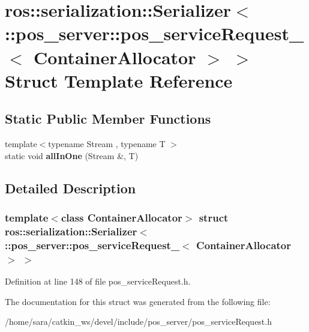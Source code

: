 \hypertarget{structros_1_1serialization_1_1Serializer_3_01_1_1pos__server_1_1pos__serviceRequest___3_01ContainerAllocator_01_4_01_4}{}\section{ros\+:\+:serialization\+:\+:Serializer$<$ \+:\+:pos\+\_\+server\+:\+:pos\+\_\+service\+Request\+\_\+$<$ Container\+Allocator $>$ $>$ Struct Template Reference}
\label{structros_1_1serialization_1_1Serializer_3_01_1_1pos__server_1_1pos__serviceRequest___3_01ContainerAllocator_01_4_01_4}
\subsection*{Static Public Member Functions}
\begin{DoxyCompactItemize}
\item 
\mbox{\label{structros_1_1serialization_1_1Serializer_3_01_1_1pos__server_1_1pos__serviceRequest___3_01ContainerAllocator_01_4_01_4_a1b747e729f3bdf54b5b83ad2ad5a4285}} 
{\footnotesize template$<$typename Stream , typename T $>$ }\\static void {\bfseries all\+In\+One} (Stream \&, T)
\end{DoxyCompactItemize}


\subsection{Detailed Description}
\subsubsection*{template$<$class Container\+Allocator$>$\newline
struct ros\+::serialization\+::\+Serializer$<$ \+::pos\+\_\+server\+::pos\+\_\+service\+Request\+\_\+$<$ Container\+Allocator $>$ $>$}



Definition at line 148 of file pos\+\_\+service\+Request.\+h.



The documentation for this struct was generated from the following file\+:\begin{DoxyCompactItemize}
\item 
/home/sara/catkin\+\_\+ws/devel/include/pos\+\_\+server/pos\+\_\+service\+Request.\+h\end{DoxyCompactItemize}
